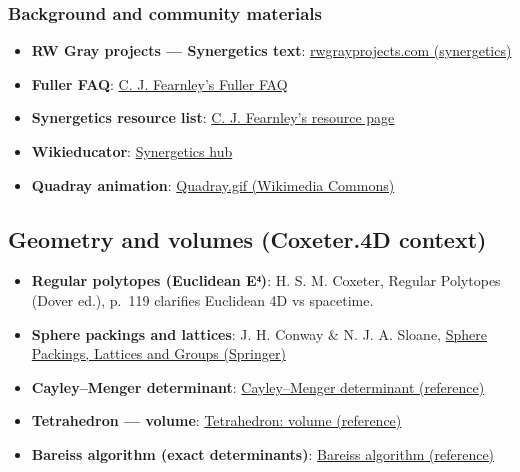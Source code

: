 \documentclass[
]{article}
\providecommand{\tightlist}{%
  \setlength{\itemsep}{0pt}\setlength{\parskip}{0pt}}
\begin{document}
\hypertarget{background-and-community-materials}{%
\subsubsection{Background and community
materials}\label{background-and-community-materials}}

\begin{itemize}
\tightlist
\item
  \textbf{RW Gray projects --- Synergetics text}:
  \href{http://www.rwgrayprojects.com/synergetics/s00/p0000.html}{rwgrayprojects.com
  (synergetics)}
\item
  \textbf{Fuller FAQ}:
  \href{https://www.cjfearnley.com/fuller-faq.pdf}{C. J. Fearnley's
  Fuller FAQ}
\item
  \textbf{Synergetics resource list}:
  \href{https://www.cjfearnley.com/fuller-faq-2.html}{C. J. Fearnley's
  resource page}
\item
  \textbf{Wikieducator}:
  \href{https://wikieducator.org/Synergetics}{Synergetics hub}
\item
  \textbf{Quadray animation}:
  \href{https://commons.wikimedia.org/wiki/File:Quadray.gif}{Quadray.gif
  (Wikimedia Commons)}
\end{itemize}

\hypertarget{geometry-and-volumes-coxeter.4d-context}{%
\subsection{Geometry and volumes (Coxeter.4D
context)}\label{geometry-and-volumes-coxeter.4d-context}}

\begin{itemize}
\tightlist
\item
  \textbf{Regular polytopes (Euclidean E⁴)}: H. S. M. Coxeter, Regular
  Polytopes (Dover ed.), p.~119 clarifies Euclidean 4D vs spacetime.
\item
  \textbf{Sphere packings and lattices}: J. H. Conway \& N. J. A.
  Sloane,
  \href{https://link.springer.com/book/10.1007/978-1-4757-6568-7}{Sphere
  Packings, Lattices and Groups (Springer)}
\item
  \textbf{Cayley--Menger determinant}:
  \href{https://en.wikipedia.org/wiki/Cayley\%E2\%80\%93Menger_determinant}{Cayley--Menger
  determinant (reference)}
\item
  \textbf{Tetrahedron --- volume}:
  \href{https://en.wikipedia.org/wiki/Tetrahedron\#Volume}{Tetrahedron:
  volume (reference)}
\item
  \textbf{Bareiss algorithm (exact determinants)}:
  \href{https://en.wikipedia.org/wiki/Bareiss_algorithm}{Bareiss
  algorithm (reference)}
\end{itemize}
\end{document}
